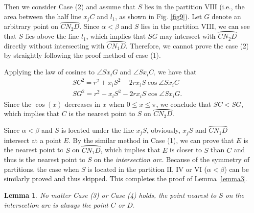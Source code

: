 \documentclass[journal]{IEEEtran}
\newtheorem{lemma}{Lemma}
\begin{document}
\begin{IEEEproof}
Then we consider Case (2) and assume that $S$ lies in the partition $\mathrm{VIII}$ (i.e., the area between the half line $x_jC$ and $l_1$, as shown in Fig. \ref{fig9}). Let $G$ denote an arbitrary point on $\wideparen{CN_2D}$. Since $\alpha <\beta$ and $S$ lies in the partition VIII, we can see that $S$ lies above
the line $l_1$, which implies that $SG$ may intersect with $\wideparen{CN_2D}$ directly without intersecting with $\wideparen{CN_1D}$. Therefore, we cannot
prove the case (2) by straightly following the proof method of case (1).

Applying the law of cosines to $\angle Sx_iG$ and $\angle Sx_iC$, we have that
\begin{equation}\label{equ1-1}
\begin{array}{l}
S{C^2} = {r^2} + {x_i}{S^2} - 2r{x_i}S\cos \angle S{x_i}C\\
S{G^2} = {r^2} + {x_i}{S^2} - 2r{x_i}S\cos \angle S{x_i}G.
\end{array}
\end{equation}
Since the $\cos (x)$ decreases in $x$ when $0\leq x\leq \pi$, we conclude that $SC <SG$, which implies that $C$ is the nearest
point to $S$ on $\wideparen{CN_2D}$.

Since $\alpha <\beta$ and $S$ is located under the line $x_jS$,
obviously, $x_jS$ and $\wideparen{CN_1D}$ intersect at a point $E$. By the similar method in Case (1), we can prove that $E$ is the
nearest point to $S$ on $\wideparen{CN_1D}$, which implies that $E$ is closer to $S$ than $C$ and thus is the nearest point to
$S$ on the \emph{intersection arc}. Because of the symmetry of partitions, the case when $S$ is located in the partition $\mathrm{II}$, $\mathrm{IV}$ or $\mathrm{VI}$ ($\alpha <\beta$) can be similarly proved and thus skipped. This completes the proof of Lemma \ref{lemma3}.
\end{IEEEproof}

\begin{lemma}\label{lemma4}
No matter Case (3) or Case (4) holds, the point nearest to $S$ on the \emph{intersection arc} is always the point $C$ or $D$.
\end{lemma}
\end{document}
